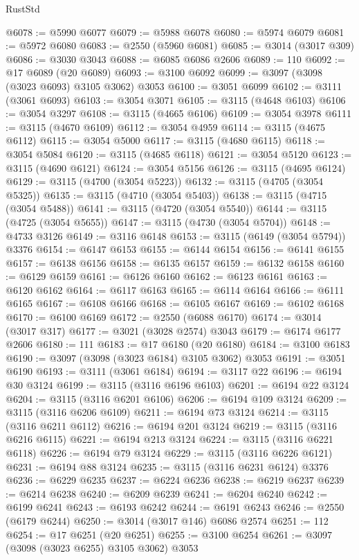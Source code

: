 \begin{lexlean}{RustStd}
\begin{coremodule}
@6078 := @5990 @6077
@6079 := @5988 @6078
@6080 := @5974 @6079
@6081 := @5972 @6080
@6083 := @2550 (@5960 @6081)
@6085 := @3014 (@3017 @309)
@6086 := @3030 @3043
@6088 := @6085 @6086 @2606
@6089 := 110
@6092 := @17 @6089 (@20 @6089)
@6093 := @3100 @6092
@6099 := @3097 (@3098 (@3023 @6093) @3105 @3062) @3053
@6100 := @3051 @6099
@6102 := @3111 (@3061 @6093)
@6103 := @3054 @3071
@6105 := @3115 (@4648 @6103)
@6106 := @3054 @3297
@6108 := @3115 (@4665 @6106)
@6109 := @3054 @3978
@6111 := @3115 (@4670 @6109)
@6112 := @3054 @4959
@6114 := @3115 (@4675 @6112)
@6115 := @3054 @5000
@6117 := @3115 (@4680 @6115)
@6118 := @3054 @5084
@6120 := @3115 (@4685 @6118)
@6121 := @3054 @5120
@6123 := @3115 (@4690 @6121)
@6124 := @3054 @5156
@6126 := @3115 (@4695 @6124)
@6129 := @3115 (@4700 (@3054 @5223))
@6132 := @3115 (@4705 (@3054 @5325))
@6135 := @3115 (@4710 (@3054 @5403))
@6138 := @3115 (@4715 (@3054 @5488))
@6141 := @3115 (@4720 (@3054 @5540))
@6144 := @3115 (@4725 (@3054 @5655))
@6147 := @3115 (@4730 (@3054 @5704))
@6148 := @4733 @3126
@6149 := @3116 @6148
@6153 := @3115 (@6149 (@3054 @5794)) @3376
@6154 := @6147 @6153
@6155 := @6144 @6154
@6156 := @6141 @6155
@6157 := @6138 @6156
@6158 := @6135 @6157
@6159 := @6132 @6158
@6160 := @6129 @6159
@6161 := @6126 @6160
@6162 := @6123 @6161
@6163 := @6120 @6162
@6164 := @6117 @6163
@6165 := @6114 @6164
@6166 := @6111 @6165
@6167 := @6108 @6166
@6168 := @6105 @6167
@6169 := @6102 @6168
@6170 := @6100 @6169
@6172 := @2550 (@6088 @6170)
@6174 := @3014 (@3017 @317)
@6177 := @3021 (@3028 @2574) @3043
@6179 := @6174 @6177 @2606
@6180 := 111
@6183 := @17 @6180 (@20 @6180)
@6184 := @3100 @6183
@6190 := @3097 (@3098 (@3023 @6184) @3105 @3062) @3053
@6191 := @3051 @6190
@6193 := @3111 (@3061 @6184)
@6194 := @3117 @22
@6196 := @6194 @30 @3124
@6199 := @3115 (@3116 @6196 @6103)
@6201 := @6194 @22 @3124
@6204 := @3115 (@3116 @6201 @6106)
@6206 := @6194 @109 @3124
@6209 := @3115 (@3116 @6206 @6109)
@6211 := @6194 @73 @3124
@6214 := @3115 (@3116 @6211 @6112)
@6216 := @6194 @201 @3124
@6219 := @3115 (@3116 @6216 @6115)
@6221 := @6194 @213 @3124
@6224 := @3115 (@3116 @6221 @6118)
@6226 := @6194 @79 @3124
@6229 := @3115 (@3116 @6226 @6121)
@6231 := @6194 @88 @3124
@6235 := @3115 (@3116 @6231 @6124) @3376
@6236 := @6229 @6235
@6237 := @6224 @6236
@6238 := @6219 @6237
@6239 := @6214 @6238
@6240 := @6209 @6239
@6241 := @6204 @6240
@6242 := @6199 @6241
@6243 := @6193 @6242
@6244 := @6191 @6243
@6246 := @2550 (@6179 @6244)
@6250 := @3014 (@3017 @146) @6086 @2574
@6251 := 112
@6254 := @17 @6251 (@20 @6251)
@6255 := @3100 @6254
@6261 := @3097 (@3098 (@3023 @6255) @3105 @3062) @3053

\end{coremodule}
\end{lexlean}
